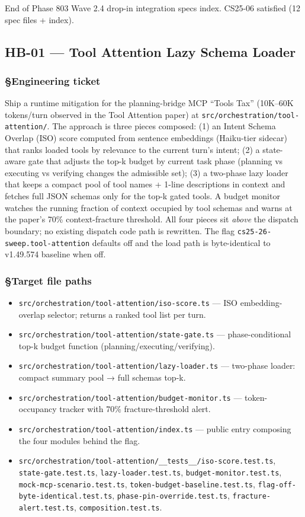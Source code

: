 \documentclass[11pt,letterpaper]{article}
\providecommand{\tightlist}{\setlength{\itemsep}{0pt}\setlength{\parskip}{0pt}}
\begin{document}
End of Phase 803 Wave 2.4 drop-in integration specs index. CS25-06
satisfied (12 spec files + index).


\subsection{HB-01 — Tool Attention Lazy Schema Loader}
\subsubsection{§Engineering ticket}

Ship a runtime mitigation for the planning-bridge MCP ``Tools Tax''
(10K--60K tokens/turn observed in the Tool Attention paper) at
\texttt{src/orchestration/tool-attention/}. The approach is three pieces
composed: (1) an Intent Schema Overlap (ISO) score computed from
sentence embeddings (Haiku-tier sidecar) that ranks loaded tools by
relevance to the current turn's intent; (2) a state-aware gate that
adjusts the top-k budget by current task phase (planning vs executing vs
verifying changes the admissible set); (3) a two-phase lazy loader that
keeps a compact pool of tool names + 1-line descriptions in context and
fetches full JSON schemas only for the top-k gated tools. A budget
monitor watches the running fraction of context occupied by tool schemas
and warns at the paper's 70\% context-fracture threshold. All four
pieces sit \emph{above} the dispatch boundary; no existing dispatch code
path is rewritten. The flag \texttt{cs25-26-sweep.tool-attention}
defaults off and the load path is byte-identical to v1.49.574 baseline
when off.

\subsubsection{§Target file paths}

\begin{itemize}
\tightlist
\item
  \texttt{src/orchestration/tool-attention/iso-score.ts} --- ISO
  embedding-overlap selector; returns a ranked tool list per turn.
\item
  \texttt{src/orchestration/tool-attention/state-gate.ts} ---
  phase-conditional top-k budget function
  (planning/executing/verifying).
\item
  \texttt{src/orchestration/tool-attention/lazy-loader.ts} --- two-phase
  loader: compact summary pool → full schemas top-k.
\item
  \texttt{src/orchestration/tool-attention/budget-monitor.ts} ---
  token-occupancy tracker with 70\% fracture-threshold alert.
\item
  \texttt{src/orchestration/tool-attention/index.ts} --- public entry
  composing the four modules behind the flag.
\item
  \texttt{src/orchestration/tool-attention/\_\_tests\_\_/iso-score.test.ts},
  \texttt{state-gate.test.ts}, \texttt{lazy-loader.test.ts},
  \texttt{budget-monitor.test.ts}, \texttt{mock-mcp-scenario.test.ts},
  \texttt{token-budget-baseline.test.ts},
  \texttt{flag-off-byte-identical.test.ts},
  \texttt{phase-pin-override.test.ts}, \texttt{fracture-alert.test.ts},
  \texttt{composition.test.ts}.
\end{itemize}
\end{document}
